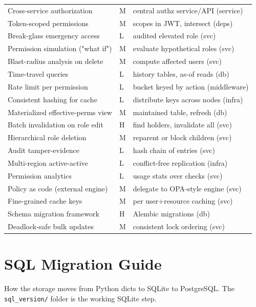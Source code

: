 \documentclass[11pt,a4paper]{report}
\begin{document}
\begin{longtable}{p{} p{} p{}}
Cross-service authorization & M & central authz service/API (service) \\
Token-scoped permissions & M & scopes in JWT, intersect (deps) \\
Break-glass emergency access & L & audited elevated role (svc) \\
Permission simulation ("what if") & M & evaluate hypothetical roles (svc) \\
Blast-radius analysis on delete & M & compute affected users (svc) \\
Time-travel queries & L & history tables, as-of reads (db) \\
Rate limit per permission & L & bucket keyed by action (middleware) \\
Consistent hashing for cache & L & distribute keys across nodes (infra) \\
Materialized effective-perms view & M & maintained table, refresh (db) \\
Batch invalidation on role edit & H & find holders, invalidate all (svc) \\
Hierarchical role deletion & M & reparent or block children (svc) \\
Audit tamper-evidence & L & hash chain of entries (svc) \\
Multi-region active-active & L & conflict-free replication (infra) \\
Permission analytics & L & usage stats over checks (svc) \\
Policy as code (external engine) & M & delegate to OPA-style engine (svc) \\
Fine-grained cache keys & M & per user+resource caching (svc) \\
Schema migration framework & H & Alembic migrations (db) \\
Deadlock-safe bulk updates & M & consistent lock ordering (svc) \\
\end{longtable}

\chapter{SQL Migration Guide}

How the storage moves from Python dicts to SQLite to PostgreSQL. The
\texttt{sql\_version/} folder is the working SQLite step.
\end{document}
